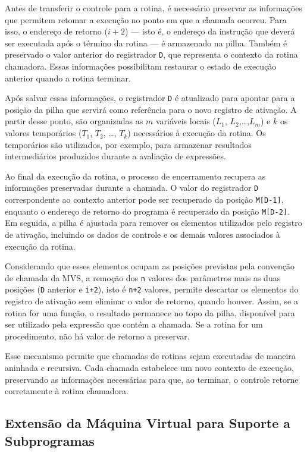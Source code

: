 \documentclass[
  brazilian,
  letterpaper,
]{book}
\theoremstyle{plain}
\theoremstyle{definition}
\theoremstyle{remark}
\begin{document}
Antes de transferir o controle para a rotina, é necessário preservar as
informações que permitem retomar a execução no ponto em que a chamada
ocorreu. Para isso, o endereço de retorno (\(i+2\)) --- isto é, o
endereço da instrução que deverá ser executada após o término da rotina
--- é armazenado na pilha. Também é preservado o valor anterior do
registrador \texttt{D}, que representa o contexto da rotina chamadora.
Essas informações possibilitam restaurar o estado de execução anterior
quando a rotina terminar.

Após salvar essas informações, o registrador \texttt{D} é atualizado
para apontar para a posição da pilha que servirá como referência para o
novo registro de ativação. A partir desse ponto, são organizadas as
\(m\) variáveis locais (\(L_1\), \(L_2\),\ldots,\(L_m\)) e \(k\) os
valores temporários (\(T_1\), \(T_2\), \ldots, \(T_k\)) necessários à
execução da rotina. Os temporários são utilizados, por exemplo, para
armazenar resultados intermediários produzidos durante a avaliação de
expressões.

Ao final da execução da rotina, o processo de encerramento recupera as
informações preservadas durante a chamada. O valor do registrador
\texttt{D} correspondente ao contexto anterior pode ser recuperado da
posição \texttt{M{[}D-1{]}}, enquanto o endereço de retorno do programa
é recuperado da posição \texttt{M{[}D-2{]}}. Em seguida, a pilha é
ajustada para remover os elementos utilizados pelo registro de ativação,
incluindo os dados de controle e os demais valores associados à execução
da rotina.

Considerando que esses elementos ocupam as posições previstas pela
convenção de chamada da MVS, a remoção dos \texttt{n} valores dos
parâmetros mais as duas posições (\texttt{D} anterior e \texttt{i+2}),
isto é \texttt{n+2} valores, permite descartar os elementos do registro
de ativação sem eliminar o valor de retorno, quando houver. Assim, se a
rotina for uma função, o resultado permanece no topo da pilha,
disponível para ser utilizado pela expressão que contém a chamada. Se a
rotina for um procedimento, não há valor de retorno a preservar.

Esse mecanismo permite que chamadas de rotinas sejam executadas de
maneira aninhada e recursiva. Cada chamada estabelece um novo contexto
de execução, preservando as informações necessárias para que, ao
terminar, o controle retorne corretamente à rotina chamadora.

\subsection{Extensão da Máquina Virtual para Suporte a
Subprogramas}\label{extensuxe3o-da-muxe1quina-virtual-para-suporte-a-subprogramas}
\end{document}

